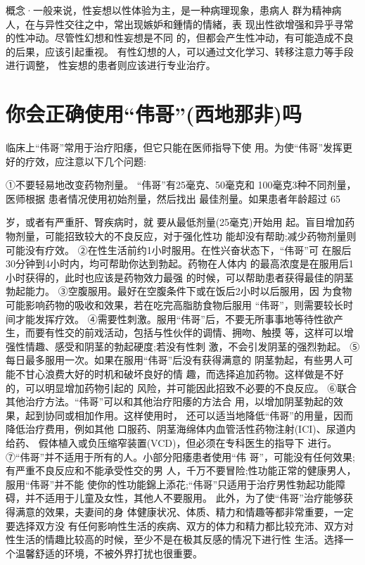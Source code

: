 \documentclass[12pt,UTF8]{ctexbook}
\begin{document}
概念·一般来说，性妄想以性体验为主，是一种病理现象，患病人
群为精神病人，在与异性交往之中，常出现嫉妒和鍾情的情緒，表
现出性欲增强和异乎寻常的性冲动。尽管性幻想和性妄想是不同
的，但都会产生性冲动，有可能造成不良的后果，应该引起重视。
有性幻想的人，可以通过文化学习、转移注意力等手段进行调整，
性妄想的患者则应该进行专业治疗。

\section{你会正确使用“伟哥”(西地那非)吗}

临床上“伟哥”常用于治疗阳痿，但它只能在医师指导下使
用。为使“伟哥”发挥更好的疗效，应注意以下几个问题:

①不要轻易地改变药物剂量。
“伟哥”有25毫克、50毫克和
100毫克3种不同剂量，医师根据
患者情况使用初始剂量，然后找出
最佳剂量。如果患者年龄超过 65

岁，或者有严重肝、腎疾病时，就
要从最低剂量(25毫克)开始用
起。盲目增加药物剂量，可能招致较大的不良反应，对于强化性功
能却没有帮助;减少药物剂量则可能没有疗效。
②在性生活前约1小时服用。在性兴奋状态下，“伟哥”可
在服后30分钟到4小时内，均可帮助你达到勃起。药物在人体内
的最高浓度是在服用后1小时获得的，此时也应该是药物效力最强
的时候，可以帮助患者获得最佳的阴茎勃起能力。
③空腹服用。最好在空腹条件下或在饭后2小时以后服用，因
为食物可能影响药物的吸收和效果，若在吃完高脂肪食物后服用
“伟哥”，则需要较长时间才能发挥疗效。
④需要性刺激。服用“伟哥”后，不要无所事事地等待性欲产
生，而要有性交的前戏活动，包括与性伙伴的调情、拥吻、触摸
等，这样可以增强性情趣、感受和阴茎的勃起硬度;若没有性刺
激，不会引发阴茎的强烈勃起。
⑤每日最多服用一次。如果在服用“伟哥”后没有获得满意的
阴茎勃起，有些男人可能不甘心浪费大好的时机和破坏良好的情
趣，而选择追加药物。这样做是不好的，可以明显增加药物引起的
风险，并可能因此招致不必要的不良反应。
⑥联合其他治疗方法。“伟哥”可以和其他治疗阳痿的方法合
用，以增加阴茎勃起的效果，起到协同或相加作用。这样使用时，
还可以适当地降低“伟哥”的用量，因而降低治疗费用，例如其他
口服药、阴茎海绵体内血管活性药物注射(ICI)、尿道内给药、
假体植入或负压缩窄装置(VCD)，但必须在专科医生的指导下
进行。
⑦“伟哥”并不适用于所有的人。小部分阳痿患者使用“伟
哥”，可能没有任何效果;有严重不良反应和不能承受性交的男
人，千万不要冒险;性功能正常的健康男人，服用“伟哥”并不能
使你的性功能錦上添花;“伟哥”只适用于治疗男性勃起功能障
碍，并不适用于儿童及女性，其他人不要服用。
此外，为了使“伟哥”治疗能够获得满意的效果，夫妻间的身
体健康状况、体质、精力和情趣等都非常重要，一定要选择双方没
有任何影响性生活的疾病、双方的体力和精力都比较充沛、双方对
性生活的情趣比较高的时候，至少不是在极其反感的情况下进行性
生活。选择一个温馨舒适的环境，不被外界打扰也很重要。
\end{document}
